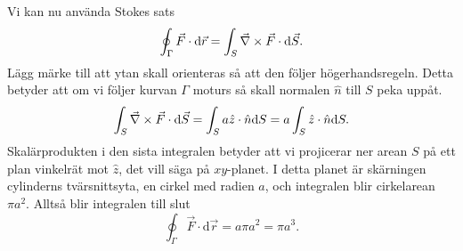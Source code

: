 \documentclass[%
oneside,                 %
final,                   %
10pt]{article}
\newenvironment{notice_mdfboxadmon}[1][]{
\begin{notice_mdfboxmdframed}[frametitle=#1]
}
{
\end{notice_mdfboxmdframed}
}
\begin{document}
\begin{notice_mdfboxadmon}
Vi kan nu använda Stokes sats
\begin{equation}
  \oint_\Gamma \vec{F} \cdot \mbox{d}\vec{r} = \int_S \vec{\nabla} \times \vec{F} \cdot
\mbox{d}\vec{S}.
\end{equation}
Lägg märke till att ytan skall orienteras så att den följer högerhandsregeln.  Detta betyder att om vi följer kurvan $\Gamma$ moturs så skall normalen $\hat{n}$ till $S$ peka uppåt.  
\begin{equation}
  \int_S \vec{\nabla} \times \vec{F} \cdot \mbox{d}\vec{S} = \int_S a \hat{z} \cdot 
\hat{n} \mbox{d}S = a \int_S \hat{z} \cdot \hat{n} \mbox{d}S.
\end{equation}
Skalärprodukten i den sista integralen betyder att vi projicerar ner arean $S$ på ett plan vinkelrät mot $\hat{z}$, det vill säga på $xy$-planet.  I detta planet är skärningen cylinderns tvärsnittsyta, en cirkel med radien $a$, och integralen blir cirkelarean $\pi a^2$. Alltså blir integralen till slut
\begin{equation}
  \oint_\Gamma \vec{F} \cdot \mbox{d}\vec{r} = a \pi a^2 = \pi a^3.
\end{equation}
\end{notice_mdfboxadmon} %
\end{document}
